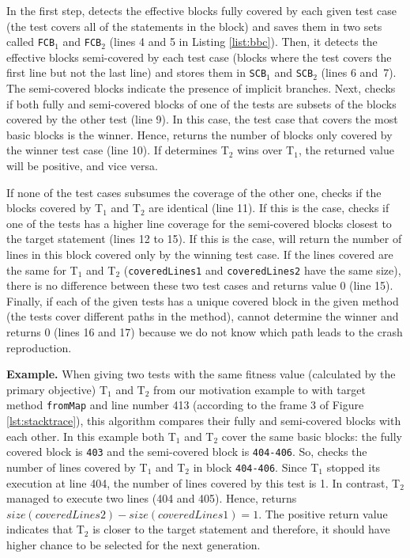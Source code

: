 In the first step, \bbc detects the effective blocks fully covered by each given test case (\ie the test covers all of the statements in the block) and saves them in two sets called \texttt{FCB$_1$} and \texttt{FCB$_2$} (lines 4 and 5 in Listing \ref{list:bbc}). Then, it detects the effective blocks semi-covered by each test case (\ie blocks where the test covers the first line but not the last line) and stores them in \texttt{SCB$_1$} and \texttt{SCB$_2$} (lines 6 and~7). 
The semi-covered blocks indicate the presence of implicit branches. Next, \bbc checks if both fully and semi-covered blocks of one of the tests are subsets of the blocks covered by the other test (line 9). In this case, the test case that covers the most basic blocks is the winner. Hence, \bbc returns the number of blocks only covered by the winner test case (line 10). If \bbc determines T$_2$ wins over T$_1$, the returned value will be positive, and vice versa. 

If none of the test cases subsumes the coverage of the other one, \bbc checks if the blocks covered by T$_1$ and T$_2$ are identical (line 11). If this is the case, \bbc checks if one of the tests has a higher line coverage for the semi-covered blocks closest to the target statement (lines 12 to 15). If this is the case, \bbc will return the number of lines in this block covered only by the winning test case. If the lines covered are the same for T$_1$ and T$_2$ (\ie \texttt{coveredLines1} and \texttt{coveredLines2} have the same size), there is no difference between these two test cases and \bbc returns value 0 (line 15).
Finally, if each of the given tests has a unique covered block in the given method (\ie the tests cover different paths in the method), \bbc cannot determine the winner and returns 0 (lines 16 and 17) because we do not know which path leads to the crash reproduction.

\textbf{Example. } 
%
When giving two tests with the same fitness value (calculated by the primary objective) T$_1$ and T$_2$ from our motivation example to \bbc with target method \texttt{fromMap} and line number 413 (according to the frame 3 of Figure \ref{lst:stacktrace}), this algorithm compares their fully and semi-covered blocks with each other. 
In this example both T$_1$ and T$_2$ cover the same basic blocks: the fully covered block is \texttt{403} and the semi-covered block is \texttt{404-406}. So, \bbc checks the number of lines covered by T$_1$ and T$_2$ in block \texttt{404-406}. Since T$_1$ stopped its execution at line 404, the number of lines covered by this test is 1. In contrast, T$_2$ managed to execute two lines (404 and 405). Hence, \bbc returns $size(coveredLines2) - size(coveredLines1) = 1$. The positive return value indicates that T$_2$ is closer to the target statement and therefore, it should have higher chance to be selected for the next generation.

